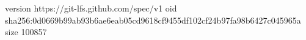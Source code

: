 version https://git-lfs.github.com/spec/v1
oid sha256:0d0669b99ab93b6ae6eab05cd9618cf9455df102cf24b97fa98b6427c045965a
size 100857
